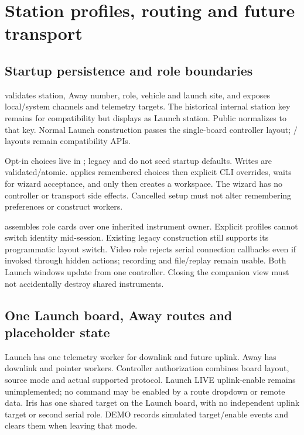 \section{Station profiles, routing and future transport}\label{sec:station-contracts}
\subsection{Startup persistence and role boundaries}
 validates station, Away number, role, vehicle and launch
site, and exposes local/system channels and telemetry targets. The historical
internal station key  remains for compatibility but displays as
Launch station. Public  normalizes to that key. Normal Launch
construction passes the single-board  controller layout;
/ layouts remain compatibility APIs.

Opt-in choices live in ; legacy
 and  do not seed startup
defaults. Writes are validated/atomic.  applies remembered
choices then explicit CLI overrides, waits for wizard acceptance, and only then
creates a workspace. The wizard has no controller or transport side effects.
Cancelled setup must not alter remembering preferences or construct workers.

 assembles role cards over one inherited instrument
owner. Explicit profiles cannot switch identity mid-session. Existing legacy
construction still supports its programmatic layout switch. Video role rejects
serial connection callbacks even if invoked through hidden actions; recording
and file/replay remain usable. Both Launch windows update from one controller.
Closing the companion view must not accidentally destroy shared instruments.

\subsection{One Launch board, Away routes and placeholder state}
Launch has one telemetry worker for downlink and future uplink. Away has
downlink and pointer workers. Controller authorization combines board layout,
source mode and actual supported protocol. Launch LIVE uplink-enable remains
unimplemented; no command may be enabled by a route dropdown or remote data.
Iris has one shared target on the Launch board, with no independent uplink
target or second serial role. DEMO records simulated target/enable events and
clears them when leaving that mode.

